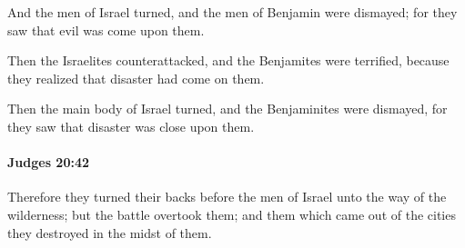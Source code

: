 			\begin{versebox}
					\item[BHS] 
					\item[ASV] And the men of Israel turned, and the men of Benjamin were dismayed; for they saw that evil was come upon them.
					\item[NIV] Then the Israelites counterattacked, and the Benjamites were terrified, because they realized that disaster had come on them.
					\item[NRSV] Then the main body of Israel turned, and the Benjaminites were dismayed, for they saw that disaster was close upon them.
			\end{versebox}

		\paragraph{Judges 20:42} %
			\label{JUDGES-20-42}

			Therefore they turned their backs before the men of Israel unto the way of the wilderness; but the battle overtook them; and them which came out of the cities they destroyed in the midst of them.

